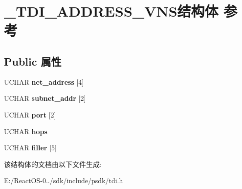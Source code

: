 \hypertarget{struct___t_d_i___a_d_d_r_e_s_s___v_n_s}{}\section{\+\_\+\+T\+D\+I\+\_\+\+A\+D\+D\+R\+E\+S\+S\+\_\+\+V\+N\+S结构体 参考}
\label{struct___t_d_i___a_d_d_r_e_s_s___v_n_s}
\subsection*{Public 属性}
\begin{DoxyCompactItemize}
\item 
\mbox{\label{struct___t_d_i___a_d_d_r_e_s_s___v_n_s_abf00b99cab4765736c15ddb3bc81fb2f}} 
U\+C\+H\+AR {\bfseries net\+\_\+address} \mbox{[}4\mbox{]}
\item 
\mbox{\label{struct___t_d_i___a_d_d_r_e_s_s___v_n_s_ac472a1bc6f2dc40563ec9b080a7f508c}} 
U\+C\+H\+AR {\bfseries subnet\+\_\+addr} \mbox{[}2\mbox{]}
\item 
\mbox{\label{struct___t_d_i___a_d_d_r_e_s_s___v_n_s_a0e455544af11e55560ead4c35a5043e2}} 
U\+C\+H\+AR {\bfseries port} \mbox{[}2\mbox{]}
\item 
\mbox{\label{struct___t_d_i___a_d_d_r_e_s_s___v_n_s_a3751a58e59a538441e7c5c415945314a}} 
U\+C\+H\+AR {\bfseries hops}
\item 
\mbox{\label{struct___t_d_i___a_d_d_r_e_s_s___v_n_s_a171acda795a05d3d7a33c2727654f67e}} 
U\+C\+H\+AR {\bfseries filler} \mbox{[}5\mbox{]}
\end{DoxyCompactItemize}


该结构体的文档由以下文件生成\+:\begin{DoxyCompactItemize}
\item 
E\+:/\+React\+O\+S-\/0../sdk/include/psdk/tdi.\+h\end{DoxyCompactItemize}
